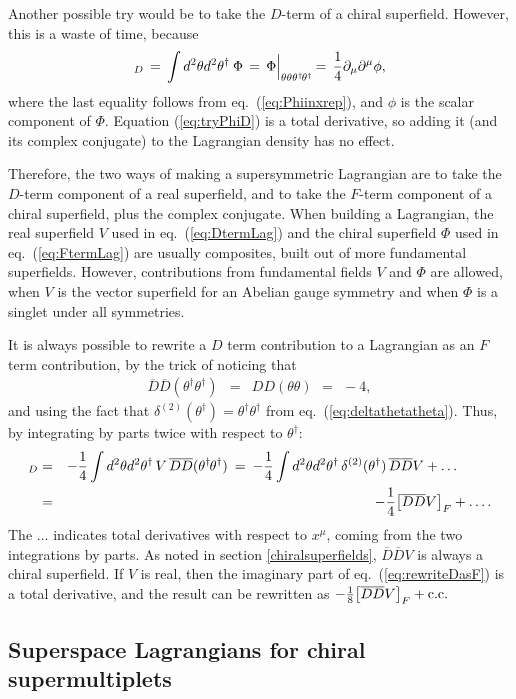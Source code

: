 \documentclass[12pt]{article}
\newcommand{\thdthd}{\theta^\dagger\hspace{-1pt}\theta^\dagger}
\def\beq{\begin{eqnarray}}
\def\eeq{\end{eqnarray}}
\def\Dcon{\overline D}
\begin{document}
Another possible try would be to take the $D$-term of a chiral superfield. However,
this is a waste of time, because
\beq
[\Phi]_D 
\,=\, \int d^2\theta d^2\theta^\dagger\> \Phi 
\,=\, 
\Phi \Bigl |_{\theta\theta\thdthd}
\,=\,
\frac{1}{4} \partial_\mu \partial^\mu \phi,
\label{eq:tryPhiD}
\eeq
where the last equality follows from eq.~(\ref{eq:Phiinxrep}), and
$\phi$ is the scalar component of $\Phi$. Equation (\ref{eq:tryPhiD})
is a total derivative, so adding it (and its complex conjugate) to the Lagrangian
density has no effect.

Therefore, the two ways of making a supersymmetric Lagrangian are to take the
$D$-term component of a real superfield, and to take the $F$-term component of
a chiral superfield, plus the complex conjugate.
When building a Lagrangian, the real superfield $V$ used in 
eq.~(\ref{eq:DtermLag}) and the chiral superfield $\Phi$ used in 
eq.~(\ref{eq:FtermLag}) are usually composites, built out of more 
fundamental superfields. However, contributions from fundamental 
fields $V$ and $\Phi$ are allowed, when $V$ is the vector superfield for 
an Abelian gauge symmetry and when $\Phi$ is a singlet under all 
symmetries.

It is always possible to rewrite a $D$ term contribution to a Lagrangian
as an $F$ term contribution, by the trick of noticing that
\beq
\Dcon\Dcon (\theta^\dagger \theta^\dagger) &=& 
DD(\theta\theta) \>\,=\,\> -4,
\label{eq:DDthetatheta}
\eeq
and using the fact that $\delta^{(2)}(\theta^\dagger) = 
\theta^\dagger\theta^\dagger$ 
from eq.~(\ref{eq:deltathetatheta}).
Thus, by integrating by parts twice with respect to $\theta^\dagger$:
\beq
[V]_D
&=&
-\frac{1}{4} \int d^2\theta d^2\theta^\dagger\, V
\,
\Dcon\Dcon (\thdthd)
\>=\>
-\frac{1}{4} \int d^2\theta d^2\theta^\dagger\,
\delta^{(2)}(\theta^\dagger) \, 
\Dcon\Dcon V 
+ \ldots\phantom{xxxx}
\label{eq:rewriteDasFz}
\\
&=&
-\frac{1}{4} \bigl [\Dcon\Dcon V \bigr ]_F 
+ 
\ldots.
\label{eq:rewriteDasF}
\eeq
The $\ldots$ indicates total derivatives with respect to $x^\mu$,
coming from the two integrations by parts. As noted in section \ref{chiralsuperfields},
$\Dcon\Dcon V$ is always a chiral superfield.
If $V$ is real, then the imaginary part of eq.~(\ref{eq:rewriteDasF}) 
is a total derivative, and the result can be rewritten as
$-\frac{1}{8} \bigl [\Dcon\Dcon V \bigr ]_F + {\rm c.c.}$

\subsection{Superspace Lagrangians for chiral supermultiplets\label{superspacelagrchiral}}
\setcounter{equation}{0}
\setcounter{footnote}{2}
\end{document}
